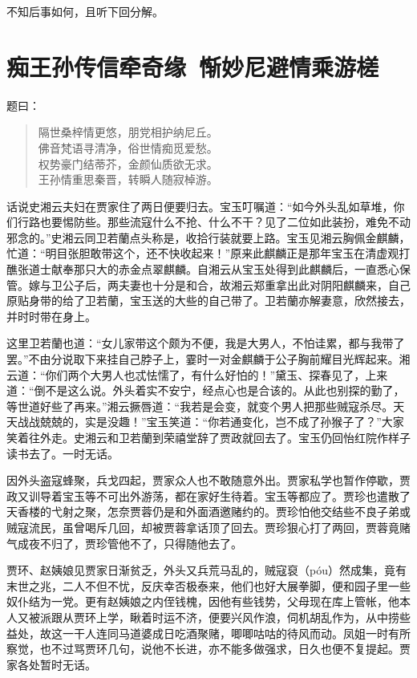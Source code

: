 \documentclass[12pt,oneside]{book}
\newenvironment{shici}{%
\begin{verse}%
\centering\large\hspace{12pt}}%
{\end{verse}}
\begin{document}
不知后事如何，且听下回分解。
 
 
\chapter{痴王孙传信牵奇缘~惭妙尼避情乘游槎}

题曰：

\begin{shici}
隔世桑梓情更悠，朋党相护纳尼丘。\\
佛音梵语寻清净，俗世情痴觅爱愁。\\
权势豪门结蒂芥，金颜仙质欲无求。\\
王孙情重思秦晋，转瞬人随寂棹游。
\end{shici}

话说史湘云夫妇在贾家住了两日便要归去。宝玉叮嘱道：“如今外头乱如草堆，你们行路也要惕防些。那些流寇什么不抢、什么不干？见了二位如此装扮，难免不动邪念的。”史湘云同卫若蘭点头称是，收拾行装就要上路。宝玉见湘云胸佩金麒麟，忙道：“明目张胆敢带这个，还不快收起来！”原来此麒麟正是那年宝玉在清虚观打醮张道士献奉那只大的赤金点翠麒麟。自湘云从宝玉处得到此麒麟后，一直悉心保管。嫁与卫公子后，两夫妻也十分是和合，故湘云郑重拿出此对阴阳麒麟来，自己原贴身带的给了卫若蘭，宝玉送的大些的自己带了。卫若蘭亦解妻意，欣然接去，并时时带在身上。

这里卫若蘭也道：“女儿家带这个颇为不便，我是大男人，不怕诖累，都与我带了罢。”不由分说取下来挂自己脖子上，霎时一对金麒麟于公子胸前耀目光辉起来。湘云道：“你们两个大男人也忒怯懦了，有什么好怕的！”黛玉、探春见了，上来道：“倒不是这么说。外头着实不安宁，经点心也是合该的。从此也别探的勤了，等世道好些了再来。”湘云撅唇道：“我若是会变，就变个男人把那些贼寇杀尽。天天战战兢兢的，实是没趣！”宝玉笑道：“你若通变化，岂不成了孙猴子了？”大家笑着往外走。史湘云和卫若蘭到荣禧堂辞了贾政就回去了。宝玉仍回怡红院作样子读书去了。一时无话。

因外头盗寇蜂聚，兵戈四起，贾家众人也不敢随意外出。贾家私学也暂作停歇，贾政又训导着宝玉等不可出外游荡，都在家好生待着。宝玉等都应了。贾珍也遣散了天香楼的弋射之聚，怎奈贾蓉仍是和外面酒邀赌约的。贾珍怕他交结些不良子弟或贼寇流民，虽曾喝斥几回，却被贾蓉拿话顶了回去。贾珍狠心打了两回，贾蓉竟赌气成夜不归了，贾珍管他不了，只得随他去了。

贾环、赵姨娘见贾家日渐贫乏，外头又兵荒马乱的，贼寇裒（póu）然成集，竟有末世之兆，二人不但不忧，反庆幸否极泰来，他们也好大展拳脚，便和园子里一些奴仆结为一党。更有赵姨娘之内侄钱槐，因他有些钱势，父母现在库上管帐，他本人又被派跟从贾环上学，瞅着时运不济，便要兴风作浪，伺机胡乱作为，从中捞些益处，故这一干人连同马道婆成日吃酒聚赌，唧唧咕咕的待风而动。凤姐一时有所察觉，也不过骂贾环几句，说他不长进，亦不能多做强求，日久也便不复提起。贾家各处暂时无话。
\end{document}
